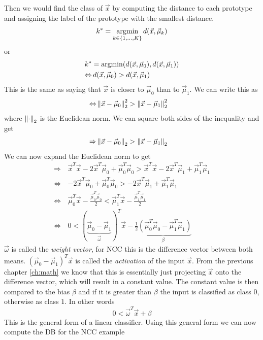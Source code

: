 Then we would find the class of $\vec{x}$ by computing the distance to each prototype and assigning the label of the prototype with the smallest distance.
\begin{equation}
  k^* = \operatorname*{argmin}_{k\in\{1,\dots,K\}} d(\vec{x}, \vec{\mu}_k)
\end{equation}
or
\begin{align}
  k^* &= \operatorname*{argmin}(d(\vec{x}, \vec{\mu}_0), d(\vec{x}, \vec{\mu}_1))\\
  \Leftrightarrow&\, d(\vec{x}, \vec{\mu}_0) > d(\vec{x}, \vec{\mu}_1)
\end{align}
This is the same as saying that $\vec{x}$ is closer to $\vec{\mu}_0$ than to $\vec{\mu}_1$. We can write this as
\begin{align}
  \Leftrightarrow& \left\lVert\vec{x} - \vec{\mu}_0\right\rVert_2^2 > \left\lVert\vec{x} - \vec{\mu}_1\right\rVert_2^2
\end{align}
where $\left\lVert\cdot\right\rVert_2$ is the Euclidean norm. We can square both sides of the inequality and get
\begin{align}
  \Rightarrow& \left\lVert\vec{x} - \vec{\mu}_0\right\rVert_2 > \left\lVert\vec{x} - \vec{\mu}_1\right\rVert_2
\end{align}
We can now expand the Euclidean norm to get
\begin{align}
  \Rightarrow\, & \vec{x}^T\vec{x} - 2\vec{x}^T\vec{\mu}_0 + \vec{\mu}_0^T\vec{\mu}_0 > \vec{x}^T\vec{x} - 2\vec{x}^T\vec{\mu}_1 + \vec{\mu}_1^T\vec{\mu}_1 \\
  \Leftrightarrow\, & - 2\vec{x}^T\vec{\mu}_0 + \vec{\mu}_0^T\vec{\mu}_0 > - 2\vec{x}^T\vec{\mu}_1 + \vec{\mu}_1^T\vec{\mu}_1 \\
  \Leftrightarrow\, & \vec{\mu}_0^T\vec{x} - \frac{\vec{\mu}_0^T\vec{\mu}_0}{2} < \vec{\mu}_1^T\vec{x} - \frac{\vec{\mu}_1^T\vec{\mu}_1}{2} \\
  \Leftrightarrow\, & 0 < (\underbrace{\vec{\mu}_0-\vec{\mu}_1}_{\vec{\omega}})^T\vec{x} - \underbrace{\frac{1}{2}\left(\vec{\mu}_0^T\vec{\mu}_0-\vec{\mu}_1^T\vec{\mu}_1\right)}_{\beta}
\end{align}
$\vec{\omega}$ is called the \textit{weight vector}, for NCC this is the difference vector between both means.
$(\vec{\mu}_0-\vec{\mu}_1)^T\vec{x}$ is called the \textit{activation} of the input $\vec{x}$. From the previous chapter \ref{ch:math} we know that this is essentially just projecting $\vec{x}$ onto the difference vector, which will result in a constant value.
The constant value is then compared to the bias $\beta$ and if it is greater than $\beta$ the input is classified as class $0$, otherwise as class $1$.
In other words
\begin{equation}
  0 < \vec{\omega}^T\vec{x} + \beta
  \label{eq:linear_classifier}
\end{equation}
This is the general form of a linear classifier.
Using this general form we can now compute the DB for the NCC example

